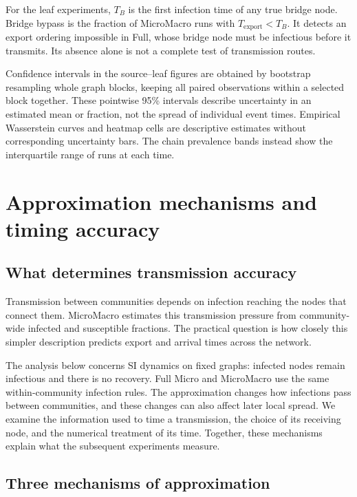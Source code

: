 \documentclass[a4paper,fleqn]{cas-sc}
\begin{document}
For the leaf experiments, $T_B$ is the first infection time of any true bridge node. Bridge bypass is the fraction of MicroMacro runs with $T_{\mathrm{export}}<T_B$. It detects an export ordering impossible in Full, whose bridge node must be infectious before it transmits. Its absence alone is not a complete test of transmission routes.

Confidence intervals in the source--leaf figures are obtained by bootstrap resampling whole graph blocks, keeping all paired observations within a selected block together. These pointwise 95\% intervals describe uncertainty in an estimated mean or fraction, not the spread of individual event times. Empirical Wasserstein curves and heatmap cells are descriptive estimates without corresponding uncertainty bars. The chain prevalence bands instead show the interquartile range of runs at each time.
\section{Approximation mechanisms and timing accuracy}
\label{sec:accuracy_error}

\subsection{What determines transmission accuracy}

Transmission between communities depends on infection reaching the nodes that connect them. MicroMacro estimates this transmission pressure from community-wide infected and susceptible fractions. The practical question is how closely this simpler description predicts export and arrival times across the network.

The analysis below concerns SI dynamics on fixed graphs: infected nodes remain infectious and there is no recovery. Full Micro and MicroMacro use the same within-community infection rules. The approximation changes how infections pass between communities, and these changes can also affect later local spread. We examine the information used to time a transmission, the choice of its receiving node, and the numerical treatment of its time. Together, these mechanisms explain what the subsequent experiments measure.

\subsection{Three mechanisms of approximation}
\end{document}
